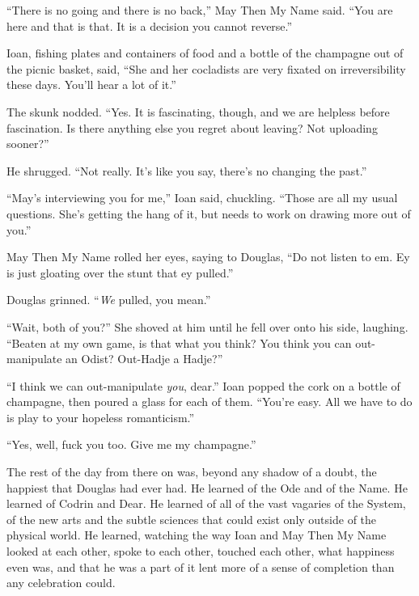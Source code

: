 ``There is no going and there is no back,'' May Then My Name said. ``You are here and that is that. It is a decision you cannot reverse.''

Ioan, fishing plates and containers of food and a bottle of the champagne out of the picnic basket, said, ``She and her cocladists are very fixated on irreversibility these days. You'll hear a lot of it.''

The skunk nodded. ``Yes. It is fascinating, though, and we are helpless before fascination. Is there anything else you regret about leaving? Not uploading sooner?''

He shrugged. ``Not really. It's like you say, there's no changing the past.''

``May's interviewing you for me,'' Ioan said, chuckling. ``Those are all my usual questions. She's getting the hang of it, but needs to work on drawing more out of you.''

May Then My Name rolled her eyes, saying to Douglas, ``Do not listen to em. Ey is just gloating over the stunt that ey pulled.''

Douglas grinned. ``\emph{We} pulled, you mean.''

``Wait, both of you?'' She shoved at him until he fell over onto his side, laughing. ``Beaten at my own game, is that what you think? You think you can out-manipulate an Odist? Out-Hadje a Hadje?''

``I think we can out-manipulate \emph{you}, dear.'' Ioan popped the cork on a bottle of champagne, then poured a glass for each of them. ``You're easy. All we have to do is play to your hopeless romanticism.''

``Yes, well, fuck you too. Give me my champagne.''

The rest of the day from there on was, beyond any shadow of a doubt, the happiest that Douglas had ever had. He learned of the Ode and of the Name. He learned of Codrin and Dear. He learned of all of the vast vagaries of the System, of the new arts and the subtle sciences that could exist only outside of the physical world. He learned, watching the way Ioan and May Then My Name looked at each other, spoke to each other, touched each other, what happiness even was, and that he was a part of it lent more of a sense of completion than any celebration could.
